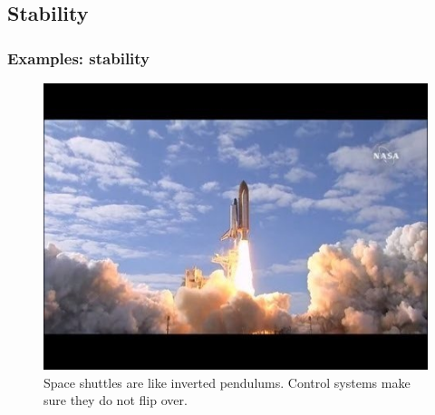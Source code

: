 \subsection[Stability]{Stability}
\begin{frame}
	\frametitle{Examples: stability}
\begin{figure}
\centering
\includegraphics[width=0.7\linewidth]{shuttle}
\caption{Space shuttles are like inverted pendulums. Control systems make sure they do not flip over.}
\label{fig:shuttle}
\end{figure}
\end{frame}

